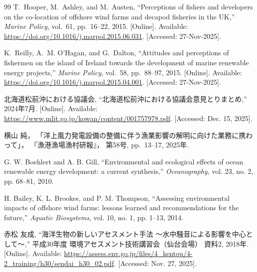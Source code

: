 \begin{thebibliography}{99}
T.~Hooper, M.~Ashley, and M.~Austen,
``Perceptions of fishers and developers on the co-location of offshore wind farms and decapod fisheries in the UK,''
\textit{Marine Policy}, vol.~61, pp.~16--22, 2015. [Online]. Available: \url{https://doi.org/10.1016/j.marpol.2015.06.031}. [Accessed: 27-Nov-2025].

K.~Reilly, A.~M. O'Hagan, and G.~Dalton,
``Attitudes and perceptions of fishermen on the island of Ireland towards the development of marine renewable energy projects,''
\textit{Marine Policy}, vol.~58, pp.~88--97, 2015. [Online]. Available: \url{https://doi.org/10.1016/j.marpol.2015.04.001}. [Accessed: 27-Nov-2025].

北海道松前沖における協議会, ``北海道松前沖における協議会意見とりまとめ,'' 2024年7月. [Online]. Available: \url{https://www.mlit.go.jp/kowan/content/001757978.pdf}. [Accessed: Dec. 15, 2025].

横山 純，
「洋上風力発電設備の整備に伴う漁業影響の解明に向けた業務に携わって」，
『漁港漁場漁村研報』，
第58号, pp.~13--17, 2025年.


G. W. Boehlert and A. B. Gill, ``Environmental and ecological effects of ocean renewable energy development: a current synthesis,'' \textit{Oceanography}, vol. 23, no. 2, pp. 68--81, 2010.

H. Bailey, K. L. Brookes, and P. M. Thompson, ``Assessing environmental impacts of offshore wind farms: lessons learned and recommendations for the future,'' \textit{Aquatic Biosystems}, vol. 10, no. 1, pp. 1--13, 2014.

赤松 友成, ``海洋生物の新しいアセスメント手法 ～水中騒音による影響を中心として～,'' 平成30年度 環境アセスメント技術講習会（仙台会場） 資料2, 2018年. [Online]. Available: \url{https://assess.env.go.jp/files/4_kentou/4-2_training/h30/sendai_h30_02.pdf}. [Accessed: Nov. 27, 2025].


\end{thebibliography}
